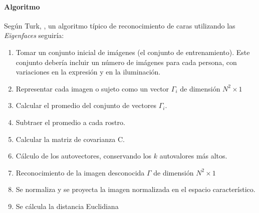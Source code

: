 \documentclass[letterpaper,12pt]{article}
\begin{document}
\paragraph{Algoritmo}
Según Turk, \cite{Turk}, un algoritmo típico de reconocimiento de caras utilizando las \emph{Eigenfaces} seguiría: 
\begin{enumerate}
\item Tomar un conjunto inicial de imágenes (el conjunto de entrenamiento). Este conjunto debería incluir un número de imágenes para cada persona, con variaciones en la expresión y en la iluminación.
\item Representar cada imagen o sujeto como un vector $\Gamma_{i}$ de dimensión $N^{2}\times 1$
\item Calcular el promedio del conjunto de vectores $\Gamma_{i}$.
\item Subtraer el promedio a cada rostro.
\item Calcular la matriz de covarianza C.
\item Cálculo de los autovectores, conservando los $k$ autovalores más altos.
\item Reconocimiento de la imagen desconocida $\Gamma$ de dimensión $N^{2}\times 1$
\item Se normaliza y se proyecta la imagen normalizada en el espacio característico.
\item Se cálcula la distancia Euclidiana
\end{enumerate}
\end{document}
